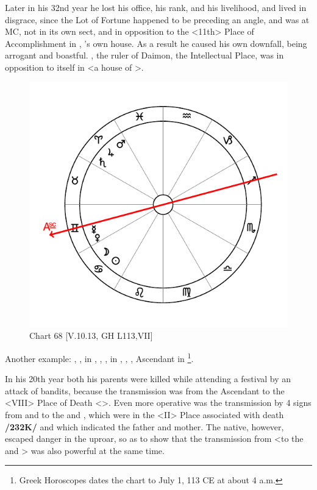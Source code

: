 Later in his 32nd year he lost his office, his rank, and his livelihood, and lived in disgrace, since the Lot of Fortune happened to be preceding an angle, and \Saturn\xspace was at MC, not in its own sect, and in opposition to the <11th> Place of Accomplishment in \Aquarius, \Saturn’s own house. As a result he caused his own downfall, being arrogant and boastful. \Mercury, the ruler of Daimon, the Intellectual Place, was in opposition to itself in \Gemini <a house of \Mercury>.

\begin{figure}
\centering
\vspace{-20pt}
\includegraphics[width=.68\textwidth]{charts/5_10_13}
\caption{Chart 68 [V.10.13, GH L113,VII]}
\label{fig:chart68}
\end{figure}

\noindent Another example: \Sun, \Moon, in \Cancer, \Saturn, \Jupiter, \Mars\xspace in \Aries, \Venus, \Mercury, Ascendant in \Gemini\footnote{{Greek Horoscopes} dates the chart to July 1, 113 CE at about 4 a.m.}. 

In his 20th year both his parents were killed while attending a festival by an attack of bandits, because the transmission was from the Ascendant to the <VIII> Place of Death <\Capricorn>. Even more operative was the transmission by 4 signs from \Saturn\xspace and \Mars\xspace to the \Sun\xspace and \Moon, which were in the
<II> Place associated with death \textbf{/232K/} and which indicated the father and mother. The native, however, escaped danger in the uproar, so as to show that the transmission from \Jupiter\xspace <to the \Sun\xspace and \Moon> was also powerful at the same time.
\newpage